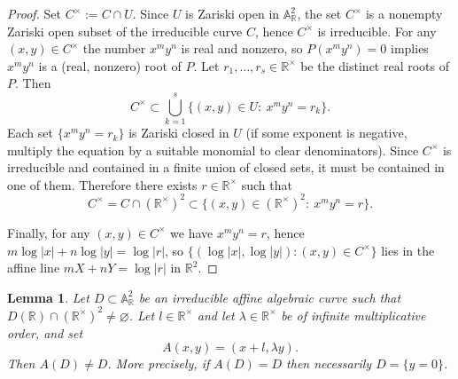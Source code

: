 \documentclass[12pt,reqno]{amsart}
\numberwithin{equation}{section}
\newtheorem{lemma}[theorem]{Lemma}
\begin{document}
\begin{proof}
Set $C^{\times}:=C\cap U$. Since $U$ is Zariski open in $\mathbb{A}^2_{\mathbb{R}}$,
the set $C^{\times}$ is a nonempty Zariski open subset of the irreducible curve $C$, hence $C^{\times}$ is irreducible.
For any $(x,y)\in C^{\times}$ the number $x^my^n$ is real and nonzero, so $P(x^my^n)=0$ implies
$x^my^n$ is a (real, nonzero) root of $P$. Let $r_1,\dots,r_s\in\mathbb{R}^{\times}$ be the distinct real roots of $P$.
Then
\[
C^{\times}\subset \bigcup_{k=1}^s \{(x,y)\in U:\ x^my^n=r_k\}.
\]
Each set $\{x^my^n=r_k\}$ is Zariski closed in $U$ (if some exponent is negative, multiply the equation by a suitable
monomial to clear denominators). Since $C^{\times}$ is irreducible and contained in a finite union of closed sets,
it must be contained in one of them. Therefore there exists $r\in\mathbb{R}^{\times}$ such that
\[
C^{\times}=C\cap(\mathbb{R}^{\times})^2 \subset \{(x,y)\in(\mathbb{R}^{\times})^2:\ x^my^n=r\}.
\]

Finally, for any $(x,y)\in C^{\times}$ we have $x^my^n=r$, hence
$m\log|x|+n\log|y|=\log|r|$,
so $\{(\log|x|,\log|y|): (x,y)\in C^{\times}\}$ lies in the affine line
$mX+nY=\log|r|$ in $\mathbb{R}^2$.
\end{proof}


\begin{lemma}\label{lem:skew_affine}
Let $D\subset \mathbb A^2_{\mathbb R}$ be an irreducible affine algebraic curve such that
$D(\mathbb R)\cap(\mathbb R^\times)^2\neq\varnothing$.
Let $l\in\mathbb R^\times$ and let $\lambda\in\mathbb R^\times$ be of infinite multiplicative order, and set
\[
A(x,y)=(x+l,\lambda y).
\]
Then $A(D)\neq D$.
More precisely, if $A(D)=D$ then necessarily $D=\{y=0\}$.
\end{lemma}
\end{document}
